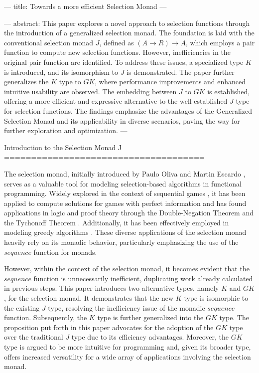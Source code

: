 ---
title: Towards a more efficient Selection Monad
---

---
abstract:
  This paper explores a novel approach to selection functions through the 
  introduction of a generalized selection monad. The foundation is laid with the 
  conventional selection monad $J$, defined as $(A \rightarrow R) \rightarrow A$, which 
  employs a pair function to compute new selection functions. However, inefficiencies in 
  the original pair function are identified. To address these issues, a specialized type 
  $K$ is introduced, and its isomorphism to $J$ is demonstrated. The paper further 
  generalizes the $K$ type to $GK$, where performance improvements and enhanced 
  intuitive usability are observed. The embedding between $J$ to $GK$ is established, 
  offering a more efficient and expressive alternative to the well established $J$ type 
  for selection functions. The findings emphasize the advantages of the Generalized 
  Selection Monad and its applicability in diverse scenarios, paving the way for further 
  exploration and optimization.
---

Introduction to the Selection Monad J
=====================================

The selection monad, initially introduced by Paulo Oliva and Martin Escardo 
\cite{escardo2010selection}, serves as a valuable tool for modeling selection-based 
algorithms in functional programming. Widely explored in the context of sequential games 
\cite{escardo2010sequential}, it has been applied to compute solutions for games with 
perfect information and has found applications in logic and proof theory through the 
Double-Negation Theorem and the Tychonoff Theorem \cite{escardo2010sequential}. 
Additionally, it has been effectively employed in modeling greedy algorithms 
\cite{hartmann2021greedyselection}. These diverse applications of the selection monad 
heavily rely on its monadic behavior, particularly emphasizing the use of the $sequence$ 
function for monads.

However, within the context of the selection monad, it becomes evident that the $sequence$ 
function is unnecessarily inefficient, duplicating work already calculated in previous 
steps. This paper introduces two alternative types, namely $K$ and $GK$, for the selection 
monad. It demonstrates that the new $K$ type is isomorphic to the existing $J$ type, 
resolving the inefficiency issue of the monadic $sequence$ function. Subsequently, the $K$ 
type is further generalized into the $GK$ type. The proposition put forth in this paper 
advocates for the adoption of the $GK$ type over the traditional $J$ type due to its 
efficiency advantages. Moreover, the $GK$ type is argued to be more intuitive for 
programming and, given its broader type, offers increased versatility for a wide array of 
applications involving the selection monad.

